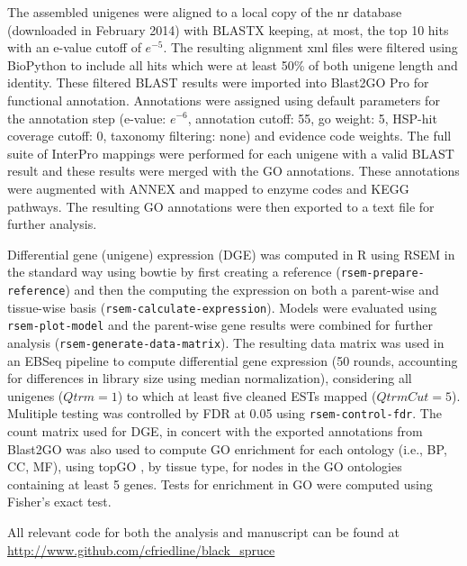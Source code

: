 \documentclass[11pt]{article}
\begin{document}
The assembled unigenes were aligned to a local copy of the nr database
(downloaded in February 2014) with BLASTX \citep{citeulike:238188}
keeping, at most, the top 10 hits with an e-value cutoff of
$e^{-5}$. The resulting alignment xml files were filtered using
BioPython \citep[v.\ 1.6.4]{citeulike:4202607} to include all hits
which were at least 50\% of both unigene length and identity. These
filtered BLAST results were imported into Blast2GO Pro \citep[v.\
2.7.2, bg2\_may14]{citeulike:2733895} for functional annotation.
Annotations were assigned using default parameters for the annotation
step (e-value: $e^{-6}$, annotation cutoff: 55, go weight: 5, HSP-hit
coverage cutoff: 0, taxonomy filtering: none) and evidence code
weights. The full suite of InterPro \citep{citeulike:12942060}
mappings were performed for each unigene with a valid BLAST result and
these results were merged with the GO annotations.  These annotations
were augmented with ANNEX \citep{annex} and mapped to enzyme codes and
KEGG \citep{citeulike:9172127} pathways. The resulting GO annotations 
were then exported to a text file for further analysis.

Differential gene (unigene) expression (DGE) was computed in R
\citep[v. 3.1.1]{R} using RSEM
\citep[v. 1.2.15]{Li:BmcBioinformatics:2011} in the standard way using
bowtie \citep[v. 2.2.3]{Langmead:NatMethods:2012} by first creating a
reference (\texttt{rsem-prepare-reference}) and then the computing the
expression on both a parent-wise and tissue-wise basis
(\texttt{rsem-calculate-expression}). Models were evaluated using
\texttt{rsem-plot-model} and the parent-wise gene results were
combined for further analysis
(\texttt{rsem-generate-data-matrix}). The resulting data matrix was
used in an EBSeq \citep{Leng:Bioinformatics:2013} pipeline to compute
differential gene expression (50 rounds, accounting for differences in
library size using median normalization), considering all unigenes
($Qtrm=1$) to which at least five cleaned ESTs mapped
($QtrmCut=5$). Mulitiple testing was controlled by FDR
\citep{benjamini1995controlling} at 0.05 using
\texttt{rsem-control-fdr}.  The count matrix used for DGE, in concert
with the exported annotations from Blast2GO was also used to compute
GO enrichment for each ontology (i.e., BP, CC, MF), using topGO
\citep{topgo}, by tissue type, for nodes in the GO ontologies containing 
at least 5 genes.  Tests for enrichment in GO were computed using 
Fisher's exact test.

All relevant code for both the analysis and manuscript can be found at
\url{http://www.github.com/cfriedline/black_spruce}
\end{document}
